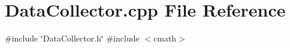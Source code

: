 \section{Data\+Collector.\+cpp File Reference}
\label{_data_collector_8cpp}
{\ttfamily \#include \char`\"{}Data\+Collector.\+h\char`\"{}}\newline
{\ttfamily \#include $<$cmath$>$}\newline
